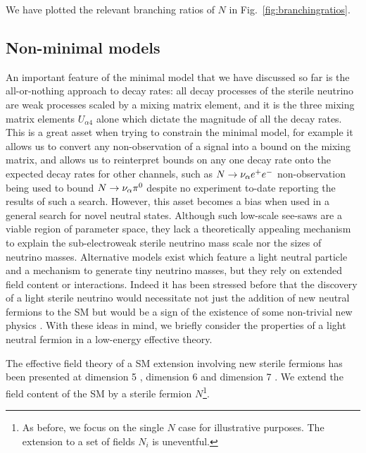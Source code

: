\documentclass[11pt, a4paper]{article}
\newcommand{\reffig}[1]{Fig.~\ref{#1}}
\def\ster{\ensuremath N}
\begin{document}
We have plotted the relevant branching ratios of $N$ in
\reffig{fig:branchingratios}.

\subsection{Non-minimal models}

An important feature of the minimal model that we have discussed so far is the
all-or-nothing approach to decay rates: all decay processes of the sterile
neutrino are weak processes scaled by a mixing matrix element, and it is the
three mixing matrix elements $U_{\alpha 4}$ alone which dictate the magnitude
of all the decay rates. This is a great asset when trying to constrain the
minimal model, for example it allows us to convert any non-observation of a
signal into a bound on the mixing matrix, and allows us to reinterpret bounds
on any one decay rate onto the expected decay rates for other channels, such as
$\ster \rightarrow \nu_\alpha e^+ e^-$ non-observation being used to bound
$\ster \rightarrow \nu_\alpha \pi^0$ despite no experiment to-date reporting
the results of such a search. 
%
However, this asset becomes a bias when used in a general search for novel
neutral states. Although such low-scale see-saws are a viable region of
parameter space, they lack a theoretically appealing mechanism to explain the
sub-electroweak sterile neutrino mass scale nor the sizes of neutrino masses.
Alternative models exist which feature a light neutral particle and a mechanism
to generate tiny neutrino masses, but they rely on extended field content or
interactions.
%
Indeed it has been stressed before that the discovery of a light sterile
neutrino would necessitate not just the addition of new neutral fermions to the
SM but would be a sign of the existence of some non-trivial new physics
\cite{delAguila:2008ir}. With these ideas in mind, we briefly consider the
properties of a light neutral fermion in a low-energy effective theory.  

The effective field theory of a SM extension involving new sterile fermions has
been presented at dimension 5 \cite{delAguila:2008ir,Aparici:2009fh}, dimension
6 \cite{delAguila:2008ir} and dimension 7 \cite{Bhattacharya:2015vja}.
%
We extend the field content of the SM by a sterile fermion $N$\footnote{As
before, we focus on the single $N$ case for illustrative purposes. The
extension to a set of fields $N_i$ is uneventful.}.  
\end{document}

